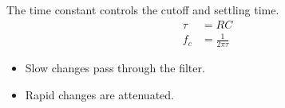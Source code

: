 \begin{notesummarybox}
  The time constant controls the cutoff and settling time.
  \[
    \begin{aligned}
      \tau &= RC \\
      f_c &= \frac{1}{2\pi\tau}
    \end{aligned}
  \]
  \begin{itemize}
    \item Slow changes pass through the filter.
    \item Rapid changes are attenuated.
  \end{itemize}
\end{notesummarybox}
